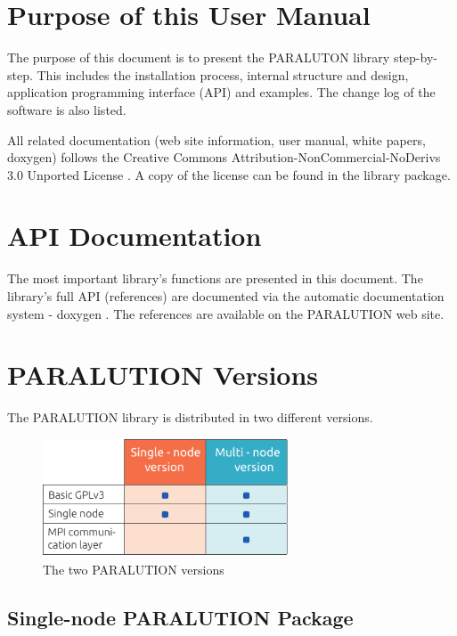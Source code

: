 \section{Purpose of this User Manual}

The purpose of this document is to present the {PARALUTON} library step-by-step. This includes the installation process, internal structure and design, application programming interface (API) and examples. The change log of the software is also listed.

All related documentation (web site information, user manual, white papers, doxygen) follows the Creative Commons Attribution-NonCommercial-NoDerivs 3.0 Unported License \cite{cc}. A copy of the license can be found in the library package.


\section{API Documentation}

The most important library's functions are presented in this document. The library's full API (references) are documented via the automatic documentation system - doxygen \cite{doxygen}. The references are available on the PARALUTION web site.

\section{PARALUTION Versions}

The PARALUTION library is distributed in two different versions.

\begin{figure}[!ht]
  \centering
  \includegraphics[width=0.65\textwidth]{./fig/ver_new.pdf}
  \caption{The two PARALUTION versions}
  \label{paralution-ver}
\end{figure}

\subsection{Single-node PARALUTION Package}

